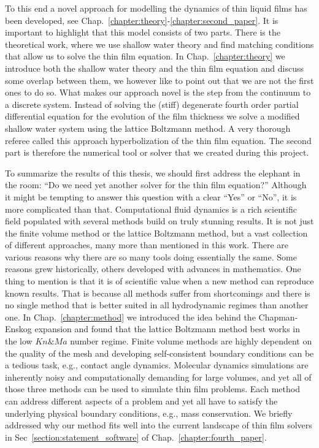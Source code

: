 To this end a novel approach for modelling the dynamics of thin liquid films has been developed, see Chap.~\ref{chapter:theory}-\ref{chapter:second_paper}.
It is important to highlight that this model consists of two parts. 
There is the theoretical work, where we use shallow water theory and find matching conditions that allow us to solve the thin film equation. 
In Chap.~\ref{chapter:theory} we introduce both the shallow water theory and the thin film equation and discuss some overlap between them, we however like to point out that we are not the first ones to do so.  
What makes our approach novel is the step from the continuum to a discrete system. 
Instead of solving the (stiff) degenerate fourth order partial differential equation for the evolution of the film thickness we solve a modified shallow water system using the lattice Boltzmann method.
A very thorough referee called this approach hyperbolization of the thin film equation.
The second part is therefore the numerical tool or solver that we created during this project.  

To summarize the results of this thesis, we should first address the elephant in the room: ``Do we need yet another solver for the thin film equation?''
Although it might be tempting to answer this question with a clear ``Yes'' or ``No'', it is more complicated than that.
Computational fluid dynamics is a rich scientific field populated with several methods build on truly stunning results.
It is not just the finite volume method or the lattice Boltzmann method, but a vast collection of different approaches, many more than mentioned in this work.
There are various reasons why there are so many tools doing essentially the same. 
Some reasons grew historically, others developed with advances in mathematics.
One thing to mention is that it is of scientific value when a new method can reproduce known results.
That is because all methods suffer from shortcomings and there is no single method that is better suited in all hydrodynamic regimes than another one.
In Chap.~\ref{chapter:method} we introduced the idea behind the Chapman-Enskog expansion and found that the lattice Boltzmann method best works in the low $Kn \& Ma$ number regime.
Finite volume methods are highly dependent on the quality of the mesh and developing self-consistent boundary conditions can be a tedious task, e.g., contact angle dynamics.
Molecular dynamics simulations are inherently noisy and computationally demanding for large volumes, and yet all of those three methods can be used to simulate thin film problems.
Each method can address different aspects of a problem and yet all have to satisfy the underlying physical boundary conditions, e.g., mass conservation.
We briefly addressed why our method fits well into the current landscape of thin film solvers in Sec~\ref{section:statement_software} of Chap.~\ref{chapter:fourth_paper}.

